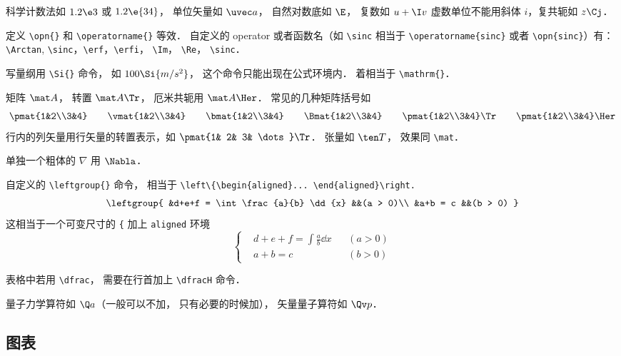 科学计数法如 $1.2\e3$ 或 $1.2\e{34}$， 单位矢量如 $\uvec a$， 自然对数底如 $\E$， 复数如 $u+\I v$ 虚数单位不能用斜体 $i$，复共轭如 $z\Cj$．

定义 \verb|\opn{}| 和 \verb|\operatorname{}| 等效． 自定义的 operator 或者函数名（如 \verb|\sinc| 相当于 \verb|\operatorname{sinc}| 或者 \verb|\opn{sinc}|）有： \verb|\Arctan|, \verb|\sinc|，\verb|\erf|，\verb|\erfi|， \verb|\Im|， \verb|\Re|， \verb|\sinc|．

写量纲用 \verb|\Si{}| 命令， 如 $100\Si{m/s^2}$， 这个命令只能出现在公式环境内． 着相当于 \verb|\mathrm{}|．

矩阵 $\mat A$， 转置 $\mat A\Tr$， 厄米共轭用 $\mat A\Her$． 常见的几种矩阵括号如
\begin{equation}
\pmat{1&2\\3&4} \qquad
\vmat{1&2\\3&4} \qquad 
\bmat{1&2\\3&4} \qquad
\Bmat{1&2\\3&4} \qquad
\pmat{1&2\\3&4}\Tr \qquad
\pmat{1&2\\3&4}\Her
\end{equation}
行内的列矢量用行矢量的转置表示，如 $\pmat{1& 2& 3& \dots}\Tr$． 张量如 $\ten T$， 效果同 \verb|\mat|．

单独一个粗体的 $\nabla$ 用 $\Nabla$．

自定义的 \verb|\leftgroup{}| 命令， 相当于 \verb|\left\{\begin{aligned}... \end{aligned}\right.|
\begin{equation}
\leftgroup{
&d+e+f = \int \frac{a}{b} \dd{x} &&(a > 0)\\
&a+b = c &&(b > 0)
}
\end{equation}
这相当于一个可变尺寸的 \verb|{| 加上 \verb|aligned| 环境
\begin{equation}
\left\{
\begin{aligned}
&d+e+f = \int \frac{a}{b} \dd{x} &&(a > 0)\\
&a+b = c &&(b > 0)
\end{aligned}
\right.
\end{equation}

表格中若用 \verb|\dfrac|， 需要在行首加上 \verb|\dfracH| 命令．%

量子力学算符如 $\Q a$（一般可以不加， 只有必要的时候加）， 矢量量子算符如 $\Qv p$．

\subsection{图表}

